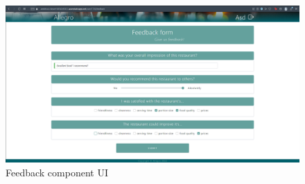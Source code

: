 \begin{figure}[ht]
	\centering
	\includegraphics[width=150mm, keepaspectratio]{figures/UI/14_Feedback.png}
	\caption{Feedback component UI} 
	\label{fig:UI_14}
\end{figure}